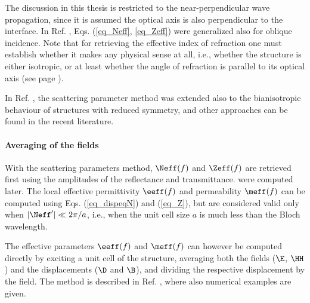 The discussion in this thesis is restricted to the near-perpendicular wave propagation, since it is assumed the optical axis is also perpendicular to the interface. In Ref. \cite{menzel2008retrieving}, Eqs. (\ref{eq_Neff}, \ref{eq_Zeff}) were generalized also for oblique incidence. Note that for retrieving the effective index of refraction one must establish whether it makes any physical sense at all, i.e., whether the structure is either isotropic, or at least whether the angle of refraction is parallel to its optical axis (see page \pageref{indexofrefraction}).

In Ref. \cite{li2009determination}, %
the scattering parameter method was extended also to the bianisotropic behaviour of structures with reduced symmetry, and other approaches can be found \cite{andryieuski2010homogenization} in the recent literature.


\paragraph{Averaging of the fields} 
With the scattering parameters method, $\Neff(f)$ and $\Zeff(f)$ are retrieved first using the amplitudes of the reflectance and transmittance.  were computed later. The  local effective permittivity $\eeff(f)$ and permeability $\meff(f)$ can be  computed using  Eqs. (\ref{eq_dispeqN}) and (\ref{eq_Z}), but are considered valid only when $|\Neff'| \ll 2\pi/a$, i.e., when the unit cell size $a$ is much less than the Bloch wavelength.

The effective parameters $\eeff(f)$ and $\meff(f)$ can however be computed directly by exciting a unit cell of the structure, averaging both the fields ($\E$, $\HH$) and the displacements ($\D$ and $\B$), and dividing the respective displacement by the field. The method is described in Ref. \cite{smith2006homogenization}, where also numerical examples are given. 


